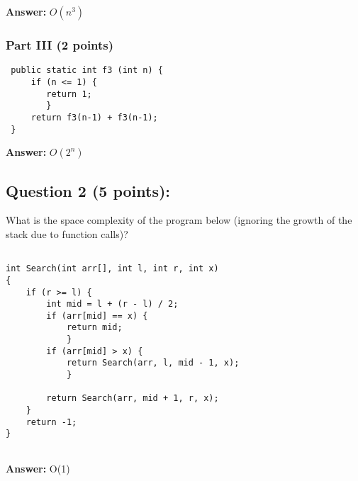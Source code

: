 \documentclass[12pt]{extarticle}
\begin{document}
{\bf Answer:}
$O(n^3)$

\vspace{10mm}
\subsubsection{Part III (2 points)}
\begin{lstlisting}
 public static int f3 (int n) {
     if (n <= 1) {
        return 1;
        }
     return f3(n-1) + f3(n-1);
 }
\end{lstlisting}

{\bf Answer:} 
$O(2^n)$


\vspace{10mm}
\subsection{Question 2 (5 points):}
What is the space complexity of the program below (ignoring the growth of the stack due to function calls)?

\begin{lstlisting}

int Search(int arr[], int l, int r, int x) 
{ 
    if (r >= l) { 
        int mid = l + (r - l) / 2; 
        if (arr[mid] == x) {
            return mid;
            }
        if (arr[mid] > x) {
            return Search(arr, l, mid - 1, x);
            }
             
        return Search(arr, mid + 1, r, x); 
    } 
    return -1; 
} 
  
\end{lstlisting}

{\bf Answer:} 
O(1)
\end{document}
